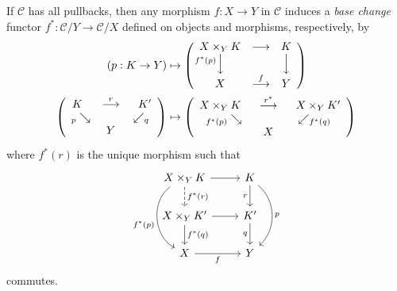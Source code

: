 \documentclass[10pt,letterpaper,cm]{nupset}
\theoremstyle{definition}
\theoremstyle{theorem}
\theoremstyle{remark}
\newcommand{\0}{\mathbf{0}}
\newcommand{\1}{\mathbf{1}}
\newcommand{\2}{\mathbf{2}}
\renewcommand{\c}{\mathscr{C}}
\begin{document}
If $\c$ has all pullbacks, then any morphism $f:X \to Y$ in $\c$ induces a \textit{base change} functor \linebreak $f^{\ast} : \c/Y \to \c/X$  defined on objects and morphisms, respectively, by 
\begin{align*}
\mleft(p : K \to Y\mright)
 & \mapsto
  \mleft(
  \begin{array}{ccc}
    X \times_Y K &\longrightarrow & K
    \\
    {}^{\mathllap{f^{\ast}(p)}}\Big\downarrow && \Big\downarrow
    \\
    X &\overset{f}{\longrightarrow}& Y 
  \end{array}
  \mright)
  \,
 \\  \mleft( 
     \begin{array}{ccc}
       K \ \ &\overset{r}{\longrightarrow} & \ \ K' \\
        {}_p \searrow & & \swarrow_{q}
       \\   
       & Y &
    \end{array}
  \mright)   & \mapsto   \mleft( 
     \begin{array}{ccc}
        X \times_Y K \ \ &\overset{r^{\ast}}{\longrightarrow} & \ \  X \times_Y K' \\
        {}_{f^{\ast}(p)} \searrow & & \swarrow_{f^{\ast}(q)}
       \\   
       & X &
    \end{array}
  \mright)
\end{align*}
 where $f^{\ast}(r)$ is the unique morphism such that
 \[
\begin{tikzcd}
X \times_Y K \arrow[r] \arrow[d, "f^{\ast}(r)", dashed] \arrow[dd, "f^{\ast}(p)"', bend right=59] & K \arrow[d, "r"'] \arrow[dd, "p", bend left=49] \\
X \times_Y K' \arrow[d, "f^{\ast}(q)"] \arrow[r]                                               & K' \arrow[d, "q"']                             \\
X \arrow[r, "f"']                                                                                    & Y                                             
\end{tikzcd}
 \]
 commutes.
\end{document}
